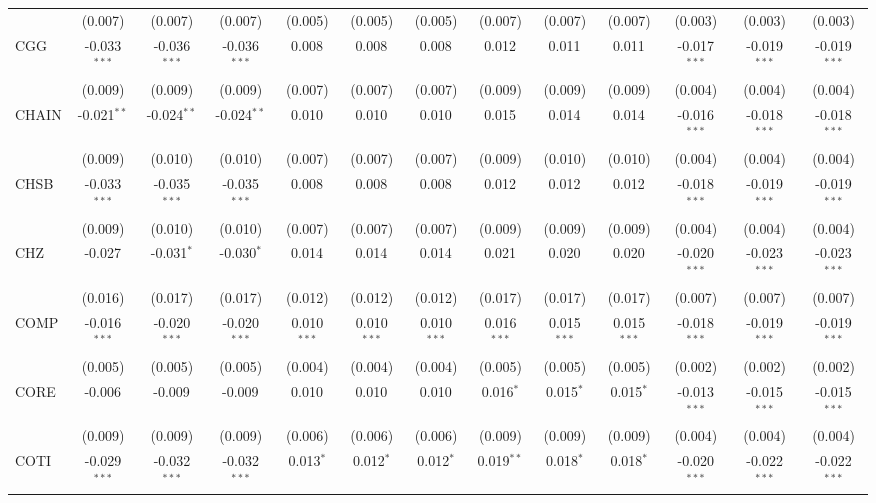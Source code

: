 \begin{table}[!htbp]
\begin{tabular}{@{\extracolsep{5pt}}lcccccccccccc}
  & (0.007) & (0.007) & (0.007) & (0.005) & (0.005) & (0.005) & (0.007) & (0.007) & (0.007) & (0.003) & (0.003) & (0.003) \\
 CGG & -0.033$^{***}$ & -0.036$^{***}$ & -0.036$^{***}$ & 0.008$^{}$ & 0.008$^{}$ & 0.008$^{}$ & 0.012$^{}$ & 0.011$^{}$ & 0.011$^{}$ & -0.017$^{***}$ & -0.019$^{***}$ & -0.019$^{***}$ \\
  & (0.009) & (0.009) & (0.009) & (0.007) & (0.007) & (0.007) & (0.009) & (0.009) & (0.009) & (0.004) & (0.004) & (0.004) \\
 CHAIN & -0.021$^{**}$ & -0.024$^{**}$ & -0.024$^{**}$ & 0.010$^{}$ & 0.010$^{}$ & 0.010$^{}$ & 0.015$^{}$ & 0.014$^{}$ & 0.014$^{}$ & -0.016$^{***}$ & -0.018$^{***}$ & -0.018$^{***}$ \\
  & (0.009) & (0.010) & (0.010) & (0.007) & (0.007) & (0.007) & (0.009) & (0.010) & (0.010) & (0.004) & (0.004) & (0.004) \\
 CHSB & -0.033$^{***}$ & -0.035$^{***}$ & -0.035$^{***}$ & 0.008$^{}$ & 0.008$^{}$ & 0.008$^{}$ & 0.012$^{}$ & 0.012$^{}$ & 0.012$^{}$ & -0.018$^{***}$ & -0.019$^{***}$ & -0.019$^{***}$ \\
  & (0.009) & (0.010) & (0.010) & (0.007) & (0.007) & (0.007) & (0.009) & (0.009) & (0.009) & (0.004) & (0.004) & (0.004) \\
 CHZ & -0.027$^{}$ & -0.031$^{*}$ & -0.030$^{*}$ & 0.014$^{}$ & 0.014$^{}$ & 0.014$^{}$ & 0.021$^{}$ & 0.020$^{}$ & 0.020$^{}$ & -0.020$^{***}$ & -0.023$^{***}$ & -0.023$^{***}$ \\
  & (0.016) & (0.017) & (0.017) & (0.012) & (0.012) & (0.012) & (0.017) & (0.017) & (0.017) & (0.007) & (0.007) & (0.007) \\
 COMP & -0.016$^{***}$ & -0.020$^{***}$ & -0.020$^{***}$ & 0.010$^{***}$ & 0.010$^{***}$ & 0.010$^{***}$ & 0.016$^{***}$ & 0.015$^{***}$ & 0.015$^{***}$ & -0.018$^{***}$ & -0.019$^{***}$ & -0.019$^{***}$ \\
  & (0.005) & (0.005) & (0.005) & (0.004) & (0.004) & (0.004) & (0.005) & (0.005) & (0.005) & (0.002) & (0.002) & (0.002) \\
 CORE & -0.006$^{}$ & -0.009$^{}$ & -0.009$^{}$ & 0.010$^{}$ & 0.010$^{}$ & 0.010$^{}$ & 0.016$^{*}$ & 0.015$^{*}$ & 0.015$^{*}$ & -0.013$^{***}$ & -0.015$^{***}$ & -0.015$^{***}$ \\
  & (0.009) & (0.009) & (0.009) & (0.006) & (0.006) & (0.006) & (0.009) & (0.009) & (0.009) & (0.004) & (0.004) & (0.004) \\
 COTI & -0.029$^{***}$ & -0.032$^{***}$ & -0.032$^{***}$ & 0.013$^{*}$ & 0.012$^{*}$ & 0.012$^{*}$ & 0.019$^{**}$ & 0.018$^{*}$ & 0.018$^{*}$ & -0.020$^{***}$ & -0.022$^{***}$ & -0.022$^{***}$ \\

\end{tabular}
\end{table}
